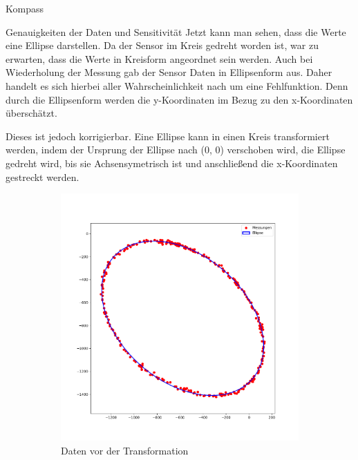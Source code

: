 \documentclass[12pt]{report}
\begin{document}
\begin{section}{Kompass}
\begin{subsection}{Genauigkeiten der Daten und Sensitivität}
  Jetzt kann man sehen, dass die Werte eine Ellipse darstellen. Da der Sensor im
  Kreis gedreht worden ist, war zu erwarten, dass die Werte in Kreisform
  angeordnet sein werden. Auch bei Wiederholung der Messung gab der Sensor Daten
  in Ellipsenform aus. Daher handelt es sich hierbei aller Wahrscheinlichkeit
  nach um eine Fehlfunktion. Denn durch die Ellipsenform werden die
  y-Koordinaten im Bezug zu den x-Koordinaten überschätzt.

  Dieses ist jedoch korrigierbar. Eine Ellipse kann in einen Kreis transformiert
  werden, indem der Ursprung der Ellipse nach (0, 0) verschoben wird, die
  Ellipse gedreht wird, bis sie Achsensymetrisch ist und anschließend die
  x-Koordinaten gestreckt werden.

  \begin{figure}[h!]
    \centering
    \captionsetup{justification=centering}
    \captionsetup[subfigure]{labelformat=empty}
    \begin{subfigure}{0.45\linewidth}
      \centering
      \includegraphics[width=\linewidth]{lernportfolio_assets/MagnetDatenMitEllipse.png}
      \caption{Daten vor der Transformation}
    \end{subfigure}
    \begin{subfigure}{0.45\linewidth}
      \centering

\end{subfigure}
\end{figure}
\end{subsection}
\end{section}
\end{document}
